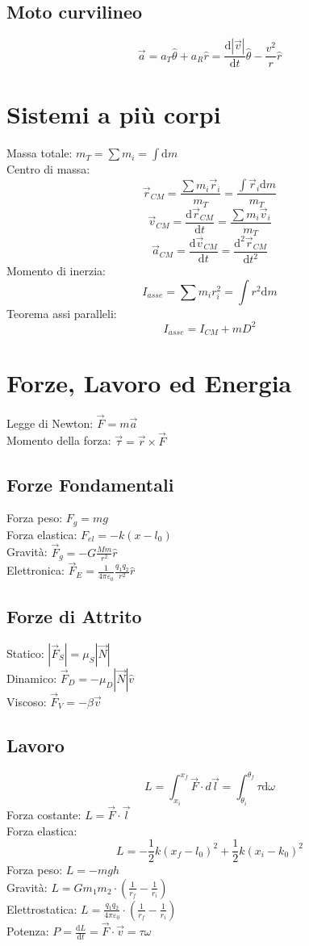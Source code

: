 \documentclass{article}
\begin{document}
\begin{small}
\begin{multicols}{3}
	\subsection{Moto curvilineo}
		\[ \vec a = a_T \hat \theta + a_R \hat r = \frac{ \mathrm d | \vec v | }{ \mathrm d t } \hat \theta - \frac{ v^2 }{ r } \hat r \]
\section{Sistemi a più corpi}
		Massa totale: $ m_T = \sum m_i = \int \mathrm d m $ \\
		Centro di massa:
		\[ \vec r_{CM} = \frac{ \sum m_i \vec r_i }{ m_T } = \frac{ \int \vec r_i \mathrm d m }{ m_T } \]
		\[ \vec v_{CM} = \frac{ \mathrm d \vec r_{CM} }{ \mathrm d t } = \frac{ \sum m_i \vec v_i}{ m_T } \]
		\[ \vec a_{CM} = \frac{ \mathrm d \vec v_{CM} }{ \mathrm d t } = \frac{ \mathrm d^2 \vec r_{CM} }{ \mathrm d t^2 } \]
		Momento di inerzia:
		\[ I_{asse} = \sum m_i r_i^2 = \int r^2 \mathrm d m \]
		Teorema assi paralleli:
		\[ I_{asse} = I_{CM} + m D^2 \]
\section{Forze, Lavoro ed Energia}
		Legge di Newton: $ \vec F = m \vec a $ \\
		Momento della forza: $ \vec \tau = \vec r \times \vec F $
	\subsection{Forze Fondamentali}
		Forza peso: $ F_g = m g $ \\
		Forza elastica: $ F_{el} = - k ( x - l_0 ) $ \\
		Gravità: $ \vec F_g = - G \frac{ M m }{ r^2 } \hat r $ \\
		Elettronica: $ \vec F_E = \frac{1}{ 4 \pi \varepsilon_0 } \frac{ q_1 q_2 }{ r^2 } \hat r $
	\subsection{Forze di Attrito}
		Statico: $ | \vec F_S | = \mu_S | \vec N | $ \\
		Dinamico: $ \vec F_D = - \mu_D | \vec N | \hat v $ \\
		Viscoso: $ \vec F_V = - \beta \vec v $
	\subsection{Lavoro}
		\[ L = \int_{x_i}^{x_f} \vec F \cdot d \vec l = \int_{\theta_i}^{\theta_f} \tau \mathrm d \omega \]
		Forza costante: $ L = \vec F \cdot \vec l $ \\
		Forza elastica:
		\[ L = - \frac{1}{2} k (x_f - l_0)^2 + \frac{1}{2} k (x_i - k_0)^2 \]
		Forza peso: $ L = - m g h $ \\
		Gravità: $ L = G m_1 m_2 \cdot ( \frac{1}{ r_f } - \frac{1}{ r_i } ) $ \\
		Elettrostatica: $ L = \frac{ q_1 q_2 }{ 4 \pi \varepsilon_0 } \cdot ( \frac{1}{ r_f } - \frac{1}{ r_i } ) $ \\
		Potenza: $ P = \frac{ \mathrm d L }{ \mathrm d t } = \vec F \cdot \vec v = \tau \omega $

\end{multicols}
\end{small}
\end{document}
